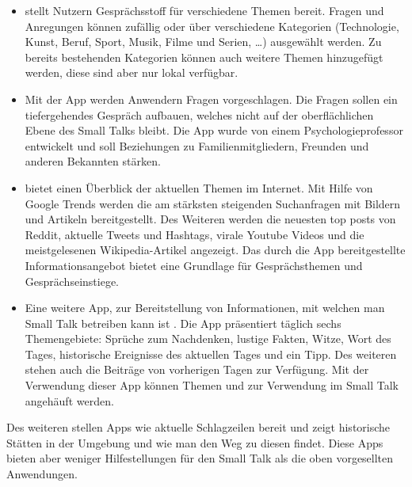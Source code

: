 \begin{itemize}
            \begin{itemize}
                  \label{list:apps}
                  \item  {} \cite{App:topicks} stellt Nutzern Gesprächsstoff für verschiedene Themen bereit. Fragen und Anregungen können zufällig oder über verschiedene Kategorien (Technologie, Kunst, Beruf, Sport, Musik, Filme und Serien, \dots) ausgewählt werden. Zu bereits bestehenden Kategorien können auch weitere Themen hinzugefügt werden, diese sind aber nur lokal verfügbar.
                  \item Mit der App  \cite{App:beyond} werden Anwendern Fragen vorgeschlagen. Die Fragen sollen ein tiefergehendes Gespräch aufbauen, welches nicht auf der oberflächlichen Ebene des Small Talks bleibt. Die App wurde von einem Psychologieprofessor entwickelt und soll Beziehungen zu Familienmitgliedern, Freunden und anderen Bekannten stärken.
                  \item {} \cite{App:trending} bietet einen Überblick der aktuellen Themen im Internet. Mit Hilfe von Google Trends \cite{misc:googletrends} werden die am stärksten steigenden Suchanfragen mit Bildern und Artikeln bereitgestellt. Des Weiteren werden die neuesten \glqq{}top posts\grqq{} von Reddit, aktuelle Tweets und Hashtags, virale Youtube Videos und die meistgelesenen Wikipedia-Artikel angezeigt. Das durch die App bereitgestellte Informationsangebot bietet eine Grundlage für Gesprächsthemen und Gesprächseinstiege.
                  \item Eine weitere App, zur Bereitstellung von Informationen, mit welchen man Small Talk betreiben kann ist  \cite{App:smalltalk}. Die App präsentiert täglich sechs Themengebiete: Sprüche zum Nachdenken, lustige Fakten, Witze, Wort des Tages, historische Ereignisse des aktuellen Tages und ein Tipp. Des weiteren stehen auch die Beiträge von vorherigen Tagen zur Verfügung. Mit der Verwendung dieser App können Themen und  zur Verwendung im Small Talk angehäuft werden.
            \end{itemize}
\end{itemize}

Des weiteren stellen Apps wie  \cite{App:nwsty} aktuelle Schlagzeilen bereit und  \cite{App:clio} zeigt historische Stätten in der Umgebung und wie man den Weg zu diesen findet. Diese Apps bieten aber weniger Hilfestellungen für den Small Talk als die oben vorgesellten Anwendungen.

